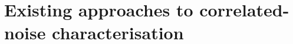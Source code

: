 \section{Existing approaches to correlated-noise characterisation}
\label{sec:existing_approaches}




